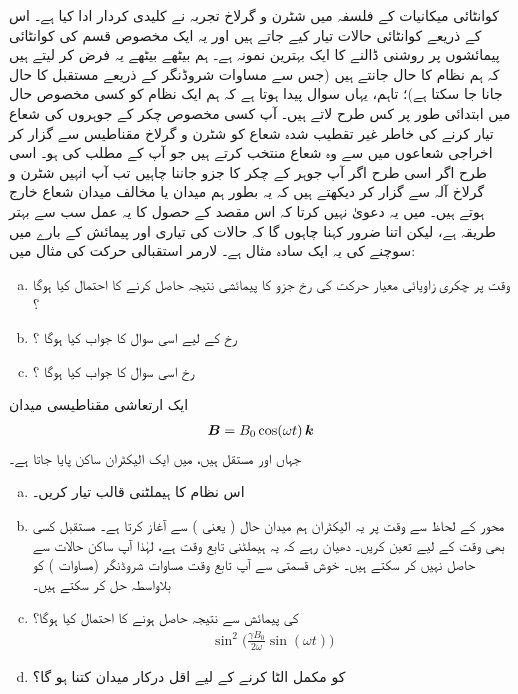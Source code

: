  کوانٹائی میکانیات کے فلسفہ میں شٹرن و گرلاخ تجربہ نے کلیدی کردار ادا کیا ہے۔ اس کے ذریعے کوانٹائی حالات تیار کیے جاتے ہیں اور یہ ایک مخصوص قسم کی کوانٹائی پیمائشوں پر روشنی ڈالنے کا ایک بہترین نمونہ ہے۔ ہم بیٹھے بیٹھے یہ فرض کر لیتے ہیں کہ ہم نظام کا  حال جانتے ہیں (جس سے مساوات شروڈنگر کے ذریعے مستقبل کا حال جانا جا سکتا ہے)؛ تاہم، یہاں سوال پیدا ہوتا ہے کہ ہم ایک نظام کو کسی مخصوص حال میں ابتدائی طور پر کس طرح لاتے ہیں۔ آپ کسی مخصوص چکر کے جوہروں کی شعاع تیار کرنے کی خاطر غیر تقطیب شدہ شعاع کو شٹرن و گرلاخ مقناطیس سے گزار کر اخراجی شعاعوں میں سے وہ شعاع منتخب کرتے ہیں جو آپ کے مطلب کی ہو۔ اسی طرح اگر اسی طرح اگر آپ جوہر کے چکر کا  جزو جاننا چاہیں تب آپ انہیں شٹرن و گرلاخ آلہ سے گزار کر دیکھتے ہیں کہ یہ بطور ہم میدان یا مخالف میدان شعاع خارج ہوتے ہیں۔ میں یہ دعویٰ نہیں کرتا کہ اس مقصد کے حصول کا یہ عمل سب سے بہتر طریقہ ہے، لیکن اتنا ضرور کہنا چاہوں گا کہ حالات کی تیاری اور پیمائش کے بارے میں سوچنے کی یہ ایک سادہ مثال ہے۔ 
لارمر استقبالی حرکت کی مثال  میں:
\begin{enumerate}[a.]
\item
وقت  پر چکری زاویائی معیار حرکت کی  رخ جزو کا پیمائشی نتیجہ  حاصل کرنے کا احتمال کیا ہوگا ؟
\item
{} رخ کے لیے اسی سوال کا جواب کیا ہوگا ؟
\item 
{} رخ اسی سوال کا جواب کیا ہوگا ؟
\end{enumerate}
ایک ارتعاشی مقناطیسی میدان 
\begin{align*}
{\ensuremath{{\boldsymbol{B}}}} = B_0 \cos(\omega t) \,{\boldsymbol{k}}
\end{align*}
جہاں  اور  مستقل ہیں، میں ایک الیکٹران ساکن پایا جاتا ہے۔
\begin{enumerate}[a.]
\item
اس نظام کا ہیملٹنی قالب تیار کریں۔
\item
محور  کے لحاظ سے وقت  پر یہ الیکٹران ہم میدان حال ( یعنی ) سے آغاز کرتا ہے۔ مستقبل کسی بھی وقت کے لیے  تعین کریں۔ دھیان رہے کہ یہ ہیملٹنی تابع وقت ہے، لہٰذا آپ ساکن حالات سے  حاصل نہیں کر سکتے ہیں۔ خوش قسمتی سے آپ تابع وقت مساوات شروڈنگر (مساوات ) کو بلاواسطہ حل کر سکتے ہیں۔ 
\item
{} کی پیمائش سے  نتیجہ حاصل ہونے کا احتمال کیا ہوگا؟  
\begin{align*}
\sin^2 \big ( \frac{\gamma B_0}{2 \omega} \sin(\omega t) \big )
\end{align*}
\item
{} کو مکمل الٹا کرنے کے لیے اقل درکار میدان  کتنا ہو گا؟ 
\end{enumerate}
